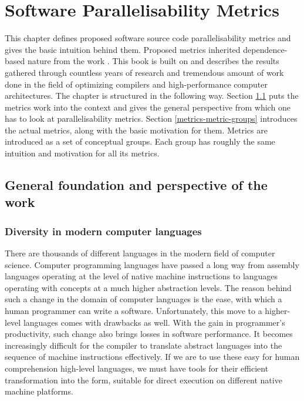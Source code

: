 \chapter{Software Parallelisability Metrics}
\qquad This chapter defines proposed software source code parallelisability metrics and gives the basic intuition behind them. Proposed metrics inherited dependence-based nature from the work \cite{optimizing-compilers-book}. This book is built on and describes the results gathered through countless years of research and tremendous amount of work done in the field of optimizing compilers and high-performance computer architectures. \newline\null\qquad The chapter is structured in the following way. Section \ref{metrics-foundation-and-perspective} puts the metrics work into the context and gives the general perspective from which one has to look at parallelisability metrics. Section \ref{metrics-metric-groups} introduces the actual metrics, along with the basic motivation for them. Metrics are introduced as a set of conceptual groups. Each group has roughly the same intuition and motivation for all its metrics.  

\section{General foundation and perspective of the work} \label{metrics-foundation-and-perspective}

\subsection{Diversity in modern computer languages}
\label{metrics-diversity-in-modern-computer-languages}
\qquad There are thousands of different languages in the modern field of computer science. Computer programming languages have passed a long way from assembly languages operating at the level of native machine instructions to languages operating with concepts at a much higher abstraction levels. The reason behind such a change in the domain of computer languages is the ease, with which a human programmer can write a software. \newline
\null\qquad Unfortunately, this move to a higher-level languages comes with drawbacks as well. With the gain in programmer's productivity, such change also brings losses in software performance. It becomes increasingly difficult for the compiler to translate abstract languages into the sequence of machine instructions effectively. \newline
\null\qquad If we are to use these easy for human comprehension high-level languages, we must have tools for their efficient transformation into the form, suitable for direct execution on different native machine platforms.

